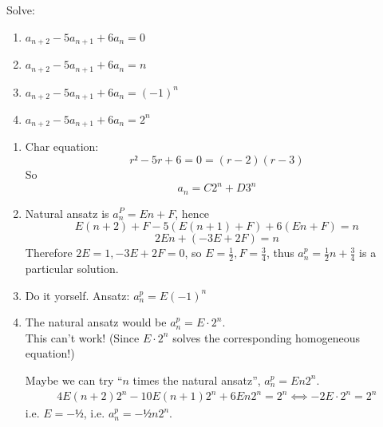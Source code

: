 \documentclass[english]{lbscript}
\begin{document}
\begin{example}{}{}
  Solve:
  \begin{enumerate}[label=\alph{*})]
    \item\label{item:25} \(a_{n+2}-5 a_{n+1} + 6 a_n = 0\)
    \item\label{item:26} \(a_{n+2}-5 a_{n+1} + 6 a_n = n\)
    \item\label{item:28} \(a_{n+2}-5 a_{n+1} + 6 a_n = (-1)^{n}\)
    \item\label{item:29} \(a_{n+2}-5 a_{n+1} + 6 a_n = 2^{n}\)
  \end{enumerate}
  \tcblower
  \begin{enumerate}[label=Sol. \alph{*})]
    \item Char equation:
          \begin{equation}
            \label{eq:83}
            r² - 5r + 6 = 0 = (r-2)(r-3)
          \end{equation}
          So
          \begin{equation}
            \label{eq:84}
            a_n=C 2^{n} + D 3^{n}
          \end{equation}
    \item Natural ansatz is \(a_{n}^{P}= En +F\), hence
          \begin{equation}
            \label{eq:85}
            E(n+2)+F - 5 (E(n+1)+F)+6(En+F)  = n
          \end{equation}
          \begin{equation}
            \label{eq:86}
            2En + (-3E +2F) = n
          \end{equation}
          Therefore \(2E=1, -3E+2F=0\), so \(E= \frac{1}{2}, F= \frac{3}{4}\), thus \(a_{n}^{p}= \frac{1}{2}n + \frac{3}{4}\) is a particular solution.
          \item\label{item:30} Do it yorself. Ansatz: \(a^{p}_{n}= E (-1)^{n}\)
          \item\label{item:31} The natural ansatz would be \(a_n^{p}=E⋅2^{n}\).\\
          This can't work! (Since \(E⋅2^{n}\) solves the corresponding homogeneous equation!)

          Maybe we can try \enquote{\(n\) times the natural ansatz}, \(a_n^{p}=En2^{n}\).
          \begin{align}
            \label{eq:87}
            4E(n+2)2^{n} - 10E(n+1)2^{n} + 6 E n 2^{n} = 2^{n} ⟺ -2E⋅2^{n} = 2^{n}
          \end{align}
          i.e. \(E=-½\), i.e. \(a_n^{p}=-½n 2^{n}\).
  \end{enumerate}
\end{example}
\end{document}
